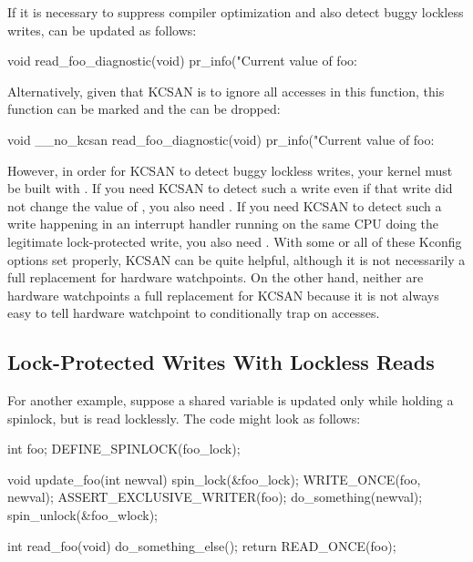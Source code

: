 If it is necessary to suppress compiler optimization and also detect
buggy lockless writes,  can be updated as follows:

\begin{VerbatimU}
	void read_foo_diagnostic(void)
	{
		pr_info("Current value of foo: %
	}
\end{VerbatimU}

Alternatively, given that KCSAN is to ignore all accesses in this function,
this function can be marked  and the  can be
dropped:

\begin{VerbatimU}
	void __no_kcsan read_foo_diagnostic(void)
	{
		pr_info("Current value of foo: %
	}
\end{VerbatimU}

However, in order for KCSAN to detect buggy lockless writes, your kernel
must be built with .
If you need KCSAN to detect such a write even if that write did not change
the value of , you also need .
If you need KCSAN to detect such a write happening in an interrupt handler
running on the same CPU doing the legitimate lock-protected write, you
also need .
With some or all of these Kconfig options set properly, KCSAN can be quite
helpful, although it is not necessarily a full replacement for hardware
watchpoints.
On the other hand, neither are hardware watchpoints a full replacement
for KCSAN because it is not always easy to tell hardware watchpoint to
conditionally trap on accesses.


\subsection{Lock-Protected Writes With Lockless Reads}

For another example, suppose a shared variable  is updated only
while holding a spinlock, but is read locklessly.
The code might look as follows:

\begin{VerbatimU}
	int foo;
	DEFINE_SPINLOCK(foo_lock);

	void update_foo(int newval)
	{
		spin_lock(&foo_lock);
		WRITE_ONCE(foo, newval);
		ASSERT_EXCLUSIVE_WRITER(foo);
		do_something(newval);
		spin_unlock(&foo_wlock);
	}

	int read_foo(void)
	{
		do_something_else();
		return READ_ONCE(foo);
	}
\end{VerbatimU}

